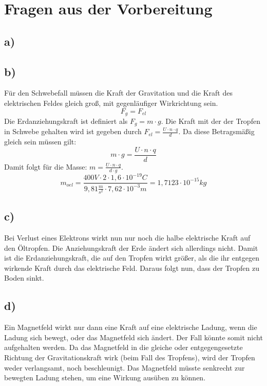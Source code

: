 \section*{Fragen aus der Vorbereitung}
\subsection*{a)}
\subsection*{b)}
Für den Schwebefall müssen die Kraft der Gravitation und die Kraft des elektrischen Feldes gleich groß, mit gegenläufiger Wirkrichtung sein.
\[F_g = F_{el}\]
Die Erdanziehungskraft ist definiert als $F_g = m \cdot g$. Die Kraft mit der der Tropfen in Schwebe gehalten wird ist gegeben durch $F_{el} = \frac{U\cdot n \cdot q}{d} $. Da diese Betragsmäßig gleich sein müssen gilt:
\[m \cdot g  = \frac{U\cdot n \cdot q}{d}\]
Damit folgt für die Masse: $m = \frac{U\cdot n \cdot q}{d \cdot g}$.
\[m_{oel} = \frac{400V \cdot 2 \cdot 1,6 \cdot 10^{-19}C}{9,81\frac{m}{s^2} \cdot 7,62 \cdot 10^{-3}m} = 1,7123\cdot10^{-15}kg\]
\subsection*{c)}
Bei Verlust eines Elektrons wirkt nun nur noch die halbe elektrische Kraft auf den Öltropfen. Die Anziehungskraft der Erde ändert sich allerdings nicht. Damit ist die Erdanziehungskraft, die auf den Tropfen wirkt größer, als die ihr entgegen wirkende Kraft durch das elektrische Feld. Daraus folgt nun, dass der Tropfen zu Boden sinkt.
\subsection*{d)}
Ein Magnetfeld wirkt nur dann eine Kraft auf eine elektrische Ladung, wenn die Ladung sich bewegt, oder das Magnetfeld sich ändert. Der Fall könnte somit nicht aufgehalten werden. Da das Magnetfeld in die gleiche oder entgegengesetzte Richtung der Gravitationskraft wirk (beim Fall des Tropfens), wird der Tropfen weder verlangsamt, noch beschleunigt. Das Magnetfeld müsste senkrecht zur bewegten Ladung stehen, um eine Wirkung ausüben zu können.